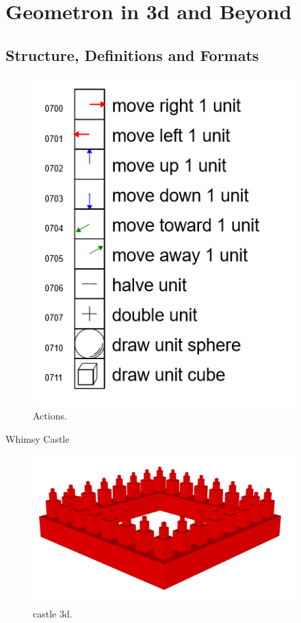 
\section{Geometron in 3d and Beyond}


\subsection{Structure, Definitions and Formats}

\begin{figure}
	\centering
	\includegraphics[width=4in]{figures/geometron3d/actions.png}
	\caption[actions3d]
	{Actions.}
\end{figure}

Whimsy Castle

\begin{figure}
	\centering
	\includegraphics[width=4in]{figures/geometron3d/whimsycastle.png}
	\caption[whimsycastle]
	{castle 3d.}
\end{figure}


